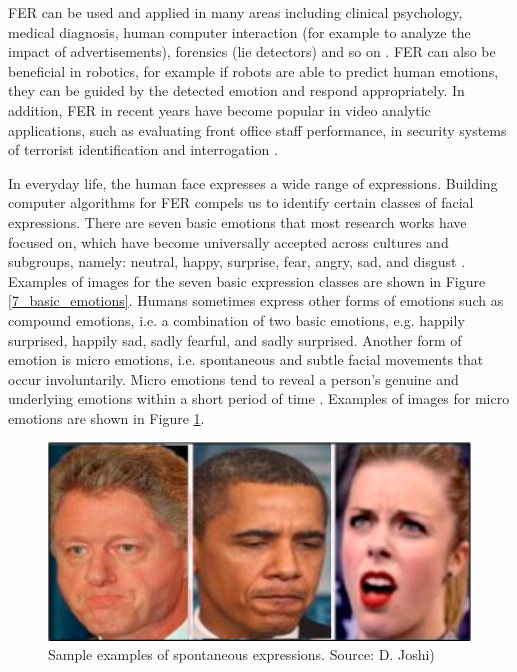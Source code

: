 \documentclass[master]{thesis-uestc}
\begin{document}
FER can be used and applied in many areas including clinical psychology, medical diagnosis, human computer interaction (for example to analyze the impact of advertisements), forensics (lie detectors) and so on . FER can also be beneficial in robotics, for example if robots are able to predict human emotions, they can be guided by the detected emotion and respond appropriately. In addition, FER in recent years have become popular in video analytic applications, such as evaluating front office staff performance, in security systems of terrorist identification and interrogation .

In everyday life, the human face expresses a wide range of expressions. Building computer algorithms for FER compels us to identify certain classes of facial expressions. There are seven basic emotions that most research works have focused on, which have become universally accepted across cultures and subgroups, namely: neutral, happy, surprise, fear, angry, sad, and disgust . Examples of images for the seven basic expression classes are shown in Figure \ref{7_basic_emotions}. Humans sometimes express other forms of emotions such as compound emotions, i.e. a combination of two basic emotions, e.g. happily surprised, happily sad, sadly fearful, and sadly surprised. Another form of emotion is micro emotions, i.e. spontaneous and subtle facial movements that occur involuntarily. Micro emotions tend to reveal a person's genuine and underlying emotions within a short period of time . Examples of images for micro emotions are shown in Figure \ref{micro_emotions}.

\begin{figure}[ht]
\includegraphics[width=5in]{pic/micro_expressions.png}
\caption{Sample examples of spontaneous expressions. Source: D. Joshi)}
\label{micro_emotions}
\end{figure}
\end{document}
